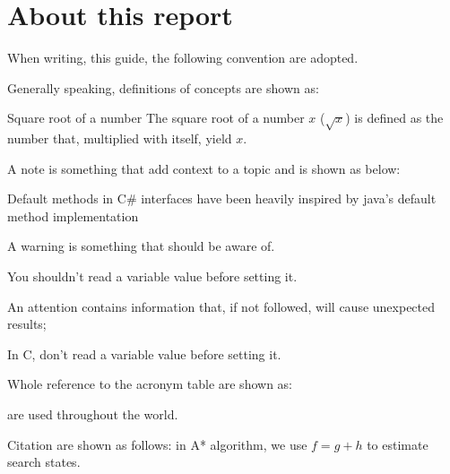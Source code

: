 \chapter{About this report}

When writing, this guide, the following convention are adopted.

Generally speaking, definitions of concepts are shown as:

\begin{definition}{Square root of a number}
    The square root of a number $x$ ($\sqrt{x}$) is defined as the number that, multiplied with itself, yield $x$.
\end{definition}

A note is something that add context to a topic and is shown as below:

\begin{info}
    Default methods in C\# interfaces have been heavily inspired by java's default method implementation
\end{info}

A warning is something that should be aware of.

\begin{warning}
    You shouldn't read a variable value before setting it.
\end{warning}

An attention contains information that, if not followed, will cause unexpected results;

\begin{attention}
    In C, don't read a variable value before setting it.
\end{attention}

Whole reference to the acronym table are shown as:

 are used throughout the world.

Citation are shown as follows: in A* algorithm, we use $f=g+h$ to estimate search states\cite{hart1968-astar}.
